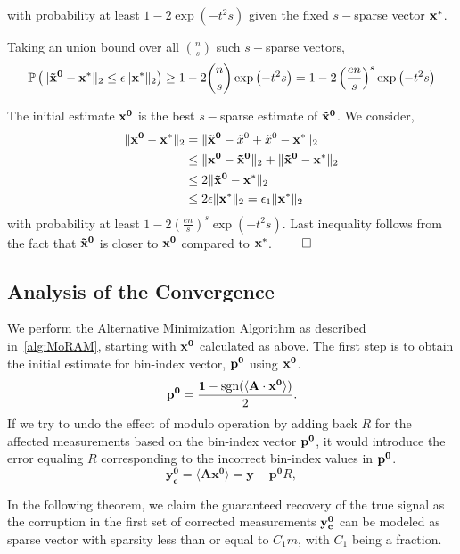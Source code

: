 with probability at least $1 - 2\exp\left(-t^2s\right)$ given the fixed $s-$sparse vector $\mathbf{x^*}$.

Taking an union bound over all $n \choose s$ such $s-$sparse vectors,
$$
\mathbb{P}\left(\|\mathbf{\tilde{x}^0} - \mathbf{x^*}\|_2 \leq \epsilon \|\mathbf{x^*}\|_2\right) \geq 1 - 2{n \choose s}\exp\left(-t^2s\right) = 1 - 2\left(\frac{en}{s}\right)^s\exp\left(-t^2s\right)
$$

The initial estimate $\mathbf{x^0}$ is the best $s-$sparse estimate of $\mathbf{\tilde{x}^0}$. We consider,
\begin{align*}
\|\mathbf{{x}^0} - \mathbf{x^*}\|_2 &=  \|\mathbf{\tilde{x}^0} -\tilde{x}^0 +\tilde{x}^0 - \mathbf{x^*}\|_2 \\
& \leq \|\mathbf{{x}^0} -\mathbf{\tilde{x}^0}\|_2 +  \|\mathbf{\tilde{x}^0} - \mathbf{x^*}\|_2 \\
& \leq 2 \|\mathbf{\tilde{x}^0} - \mathbf{x^*}\|_2 \\
& \leq 2 \epsilon \|\mathbf{x^*}\|_2 = \epsilon_1 \|\mathbf{x^*}\|_2
\end{align*}
with probability at least $1 - 2\left(\frac{en}{s}\right)^s\exp\left(-t^2s\right)$.
Last inequality follows from the fact that $\mathbf{\tilde{x}^0}$ is closer to $\mathbf{x^0}$ compared to $\mathbf{x^*}$. $\qed$

\subsection{Analysis of the Convergence}
We perform the Alternative Minimization Algorithm as described in~\ref{alg:MoRAM}, starting with $\mathbf{x^0}$ calculated as above. 
The first step is to obtain the initial estimate for bin-index vector, $\mathbf{p^0}$ using $\mathbf{x^0}$.
$$
\mathbf{{p}^{0}} = \frac{\mathbf{1}-\mathrm{sgn}(\langle \mathbf{A} \cdot \mathbf{x^0} \rangle)}{2}.
$$
If we try to undo the effect of modulo operation by adding back $R$ for the affected measurements based on the bin-index vector $\mathbf{p^0}$, it would introduce the error equaling $R$ corresponding to the incorrect bin-index values in $\mathbf{p^0}$.
$$
\mathbf{y^0_c} = \langle \mathbf{A}\mathbf{x^{0}} \rangle = \mathbf{y} - \mathbf{p^0}R,
$$

In the following theorem, we claim the guaranteed recovery of the true signal as the corruption in the first set of corrected measurements $\mathbf{y_c^0}$ can be modeled as sparse vector with sparsity less than or equal to $C_1m$, with $C_1$ being a fraction.

